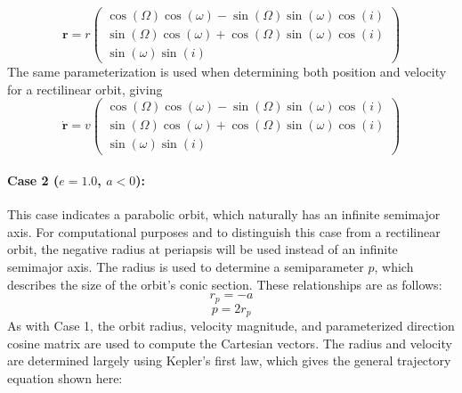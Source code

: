 \begin{equation} \label{eq:3}
\bm{r} = r\begin{pmatrix}
\cos(\Omega)\cos(\omega)-\sin(\Omega)\sin(\omega)\cos(i) \\ \sin(\Omega)\cos(\omega)+\cos(\Omega)\sin(\omega)\cos(i) \\ \sin(\omega)\sin(i)
\end{pmatrix}
\end{equation}
The same parameterization is used when determining both position and velocity for a rectilinear orbit, giving
\begin{equation} \label{eq:4}
\bm{\dot{r}} = v\begin{pmatrix}
\cos(\Omega)\cos(\omega)-\sin(\Omega)\sin(\omega)\cos(i) \\ \sin(\Omega)\cos(\omega)+\cos(\Omega)\sin(\omega)\cos(i) \\ \sin(\omega)\sin(i)
\end{pmatrix}
\end{equation}

\paragraph{Case 2 (\boldmath $e=1.0$, $a<0$):} This case indicates a parabolic orbit, which naturally has an infinite semimajor axis. For computational purposes and to distinguish this case from a rectilinear orbit, the negative radius at periapsis will be used instead of an infinite semimajor axis. The radius is used to determine a semiparameter $p$, which describes the size of the orbit's conic section. These relationships are as follows:
\begin{equation} \label{eq:6}
r_p = -a
\end{equation}
\begin{equation} \label{eq:7}
p = 2r_p
\end{equation}
As with Case 1, the orbit radius, velocity magnitude, and parameterized direction cosine matrix are used to compute the Cartesian vectors. The radius and velocity  are determined largely using Kepler's first law, which gives the general trajectory equation shown here:

